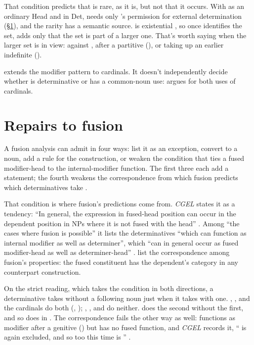 \documentclass[12pt]{article}
\begin{document}
That condition predicts that  is rare, as it is, but not that it occurs. With  as an ordinary Head and  in Det,  needs only 's permission for external determination (§\ref{sec:repairs}), and the rarity has a semantic source.  is existential \citep[380]{huddleston2002}, so once  identifies the set,  adds only that the set is part of a larger one. That's worth saying when the larger set is in view: against , after a partitive (), or taking up an earlier indefinite ().

 extends the modifier pattern to cardinals. It doesn't independently decide whether  is determinative or has a common-noun use: \textcite{reynolds2026numerals} argues for both uses of cardinals.

\section{Repairs to fusion}\label{sec:repairs}

A fusion analysis can admit  in four ways: list it as an exception, convert  to a noun, add a rule for the construction, or weaken the condition that ties a fused modifier-head to the internal-modifier function. The first three each add a statement; the fourth weakens the correspondence from which fusion predicts which determinatives take .

That condition is where fusion's predictions come from. \textit{CGEL} states it as a tendency: \enquote{In general, the expression in fused-head position can occur in the dependent position in NPs where it is not fused with the head} \citep[410]{huddleston2002}. Among \enquote{the cases where fusion is possible} it lists the determinatives \enquote{which can function as internal modifier as well as determiner}, which \enquote{can in general occur as fused modifier-head as well as determiner-head} \citep[415]{huddleston2002}. \textcite[571]{Payne2007} list the correspondence among fusion's properties: the fused constituent has the dependent's category in any counterpart construction.

On the strict reading, which takes the condition in both directions, a determinative takes  without a following noun just when it takes  with one. , , and the cardinals do both (, ); , , and  do neither.  does the second without the first, and so does  in . The correspondence fails the other way as well:  functions as modifier after a genitive () but has no fused function, and \textit{CGEL} records it, \enquote{ is again excluded, and so too this time is } \citep[416]{huddleston2002}.
\end{document}
